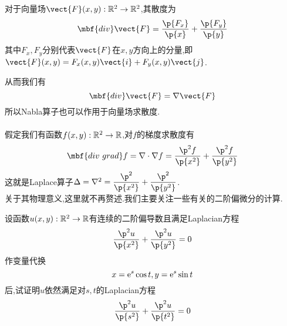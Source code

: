 \documentclass{ctexart}
\begin{document}
\begin{formal}[2.1 散度的定义]
    对于向量场$\vect{F}(x,y):\R^2\to\R^2$,其散度为
$$\mbf{div}\vect{F}=\dfrac{\p{F_x}}{\p{x}}+\dfrac{\p{F_y}}{\p{y}}$$
其中${F_x},{F_y}$分别代表$\vect{F}$在$x,y$方向上的分量,即$\vect{F}(x,y)=F_x(x,y)\vect{i}+F_y(x,y)\vect{j}$.
\end{formal}\noindent
从而我们有
$$\mbf{div}\vect{F}=\nabla\vect{F}$$
所以Nabla算子也可以作用于向量场求散度.\\
\\
假定我们有函数$f(x,y):\mathbb{R}^2\to\mathbb{R}$,对$f$的梯度求散度有
$$\mbf{div\ grad}f=\nabla\cdot\nabla f=\dfrac{\p^2{f}}{\p{x^2}}+\dfrac{\p^2{f}}{\p{y^2}}$$
这就是Laplace算子$\Delta=\nabla^2=\dfrac{\p^2}{\p{x^2}}+\dfrac{\p^2}{\p{y^2}}$.\\
关于其物理意义,这里就不再赘述.我们主要关注一些有关的二阶偏微分的计算.
\begin{problem}[Example 3.1]
    设函数$u(x,y):\mathbb{R}^2\to\mathbb{R}$有连续的二阶偏导数且满足Laplacian方程
    $$\dfrac{\p^2u}{\p{x^2}}+\dfrac{\p^2u}{\p{y^2}}=0$$
    作变量代换$$x=\mathrm{e}^s\cos t,y=\mathrm{e}^s\sin t$$
    后,试证明$u$依然满足对$s,t$的Laplacian方程
    $$\dfrac{\p^2u}{\p{s^2}}+\dfrac{\p^2u}{\p{t^2}}=0$$
\end{problem}
\end{document}
